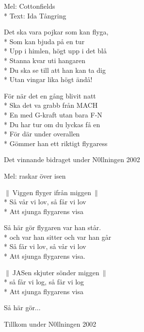 \begin{SongText}
    \begin{SongInfo}
        Mel: Cottonfields\\*%
        Text: Ida Tångring
    \end{SongInfo}
    \begin{SongVerse}
        Det ska vara pojkar som kan flyga,\\*%
        Som kan bjuda på en tur\\*%
        Upp i himlen, högt upp i det blå\\*%
        Stanna kvar uti hangaren\\*%
        Du ska se till att han kan ta dig\\*%
        Utan vingar lika högt ändå!
    \end{SongVerse}
    \begin{SongVerse}
        För när det en gång blivit natt\\*%
        Ska det va grabb från MACH\\*%
        En med G-kraft utan bara F-N\\*%
        Du har tur om du lyckas få en\\*%
        För där under overallen\\*%
        Gömmer han ett riktigt flygaress
    \end{SongVerse}
    \begin{SongInfo}
        Det vinnande bidraget under N0llningen 2002
    \end{SongInfo}
\end{SongText}
\begin{SongText}[Flygarvisan]
    \begin{SongInfo}
        Mel: raskar över isen
    \end{SongInfo}
    \begin{SongVerse}
        $\|\:$Viggen flyger ifrån miggen$\:\|$\\*%
        Så vår vi lov, så får vi lov\\*%
        Att sjunga flygarens visa
    \end{SongVerse}
    \begin{SongVerse}
        Så här gör flygaren var han står.\\*%
        och var han sitter och var han går\\*%
        Så får vi lov, så vår vi lov\\*%
        Att sjunga flygarens visa.
    \end{SongVerse}
    \begin{SongVerse}
        $\|\:$JASen skjuter sönder miggen$\:\|$\\*%
        så får vi log, så får vi log\\*%
        Att sjunga flygarens visa
    \end{SongVerse}
    \begin{SongVerse}
        Så här gör...
    \end{SongVerse}
    \begin{SongInfo}
        Tillkom under N0llningen 2002
    \end{SongInfo}
\end{SongText}
